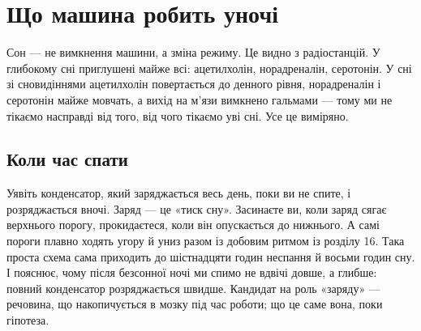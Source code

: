 \chapter{Що машина робить уночі}

Сон --- не вимкнення машини, а зміна режиму. Це видно з радіостанцій. У глибокому сні приглушені майже всі: ацетилхолін, норадреналін, серотонін. У сні зі сновидіннями ацетилхолін повертається до денного рівня, норадреналін і серотонін майже мовчать, а вихід на м'язи вимкнено гальмами --- тому ми не тікаємо насправді від того, від чого тікаємо уві сні. Усе це виміряно.

\section*{Коли час спати}

Уявіть конденсатор, який заряджається весь день, поки ви не спите, і розряджається вночі. Заряд --- це «тиск сну». Засинаєте ви, коли заряд сягає верхнього порогу, прокидаєтеся, коли він опускається до нижнього. А самі пороги плавно ходять угору й униз разом із добовим ритмом із розділу 16. Така проста схема сама приходить до шістнадцяти годин неспання й восьми годин сну. І пояснює, чому після безсонної ночі ми спимо не вдвічі довше, а глибше: повний конденсатор розряджається швидше. Кандидат на роль «заряду» --- речовина, що накопичується в мозку під час роботи; що це саме вона, поки гіпотеза.


